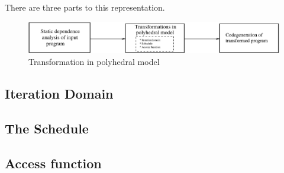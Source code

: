 There are three parts to this representation.
\begin{figure}
  \label{fig:poly_steps}
  \includegraphics[width=1\textwidth]{images/poly_steps.eps}
  \caption{Transformation in polyhedral model}
\end{figure}

\subsection{Iteration Domain}
\subsection{The Schedule}
\subsection{Access function}
